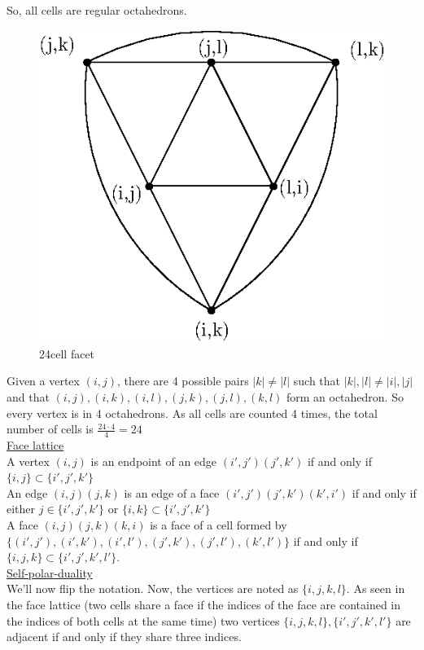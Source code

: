 \documentclass[paper=a4, fontsize=11pt]{scrartcl} %
\theoremstyle{plain}
\begin{document}
So, all cells are regular octahedrons.

\begin{figure}[!htb]
\centering
\includegraphics[scale=0.8]{figures/facet.eps}
\caption{24cell facet}
\label{fig:face}
\end{figure}

Given a vertex $(i,j)$, there are 4 possible pairs $\vert k \vert \neq \vert l \vert$ such that $\vert k \vert, \vert l \vert \neq \vert i \vert, \vert j \vert$ and that $(i,j),(i,k),(i,l),(j,k),(j,l),(k,l)$ form an octahedron. So every vertex is in 4 octahedrons. As all cells are counted 4 times, the total number of cells is $\frac{24 \cdot 4}{4} = 24$ \\

\underline{Face lattice} \\

A vertex $(i,j)$ is an endpoint of an edge $(i',j')(j',k')$ if and only if $\{i,j\} \subset \{i',j',k'\}$ \\

An edge $(i,j)(j,k)$ is an edge of a face $(i',j')(j',k')(k',i')$ if and only if either $j \in \{i',j',k'\}$ or $\{i,k\} \subset \{i',j',k'\}$ \\

A face $(i,j)(j,k)(k,i)$ is a face of a cell formed by $\{(i',j'),(i',k'),(i',l'),(j',k'),(j',l'),(k',l')\}$ if and only if $\{i,j,k\} \subset \{i',j',k',l'\}$.\\

\underline{Self-polar-duality} \\

We'll now flip the notation. Now, the vertices are noted as $\{i,j,k,l\}$. As seen in the face lattice (two cells share a face if the indices of the face are contained in the indices of both cells at the same time) two vertices $\{i,j,k,l\},\{i',j',k',l'\}$ are adjacent if and only if they share three indices. 
\end{document}
